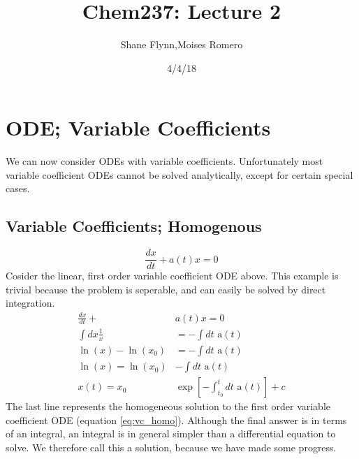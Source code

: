 \documentclass{article}
\title{Chem237: Lecture 2}
\date{4/4/18}
\author{Shane Flynn,Moises Romero}
\newcommand{\be}{\begin{equation}}
\newcommand{\ee}{\end{equation}}
\begin{document}
\maketitle
\section*{ODE; Variable Coefficients}
We can now consider ODEs with variable coefficients.
Unfortunately most variable coefficient ODEs cannot be solved analytically, except for certain special cases. 

\subsection*{Variable Coefficients; Homogenous}
\be \label{eq:vc_homo}
\frac{dx}{dt} + a(t) x = 0
\ee
Cosider the linear, first order variable coefficient ODE above. 
This example is trivial because the problem is seperable, and can easily be solved by direct integration.
\be
\begin{split}
    \frac{dx}{dt} + &a(t) x = 0 \\
    \int dx \frac{1}{x} &= -\int dt \text{ a}(t) \\
    \ln(x) -\ln(x_0)  &= -\int dt \text{ a}(t) \\
    \ln(x)  = \ln(x_0) &-\int dt \text{ a}(t) \\
    x(t) = x_0 &\exp\left[-\int_{t_0}^t dt \text{ a}(t)\right] + c
\end{split}
\ee
The last line represents the homogeneous solution to the first order variable coefficient ODE (equation \ref{eq:vc_homo}).
Although the final answer is in terms of an integral, an integral is in general simpler than a differential equation to solve.
We therefore call this a solution, because we have made some progress. 
\end{document}
